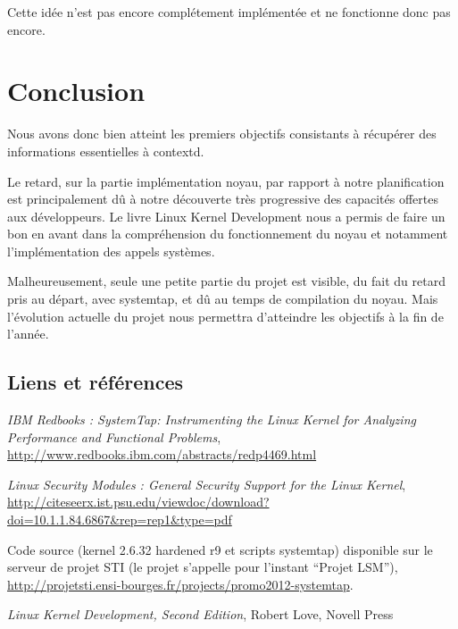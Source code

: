 \documentclass[pdftex,a4paper,titlepage,11pt,openright]{article}
\newcommand{\clearemptydoublepage}{
	\newpage{\pagestyle{empty}\cleardoublepage}}
\begin{document}
Cette idée n'est pas encore complétement implémentée et ne fonctionne donc pas encore.

\newpage

\clearemptydoublepage

\section*{Conclusion} 

Nous avons donc bien atteint les premiers objectifs consistants à récupérer des informations essentielles à contextd.

Le retard, sur la partie implémentation noyau, par rapport à notre planification est principalement dû à notre découverte très progressive des capacités offertes aux développeurs. Le livre Linux Kernel Development \cite{LKDSE} nous a permis de faire un bon en avant dans la compréhension du fonctionnement du noyau et notamment l'implémentation des appels systèmes.

Malheureusement, seule une petite partie du projet est visible, du fait du retard pris au départ, avec systemtap, et dû au temps de compilation du noyau. Mais l'évolution actuelle du projet nous permettra d'atteindre les objectifs à la fin de l'année.

\newpage
{}

\subsection*{Liens et références}
\begin{thebibliography}{40}
 \textit{IBM Redbooks : SystemTap: Instrumenting the Linux Kernel for Analyzing Performance and Functional Problems}, \url{http://www.redbooks.ibm.com/abstracts/redp4469.html}

 \textit{Linux Security Modules : General Security Support for the Linux Kernel}, \url{http://citeseerx.ist.psu.edu/viewdoc/download?doi=10.1.1.84.6867&rep=rep1&type=pdf}

 Code source (kernel 2.6.32 hardened r9 et scripts systemtap) disponible sur le serveur de projet STI (le projet s'appelle pour l'instant ``Projet LSM''), \url{http://projetsti.ensi-bourges.fr/projects/promo2012-systemtap}.

 \textit{Linux Kernel Development, Second Edition}, Robert Love, Novell Press
\end{thebibliography}

\end{document}
